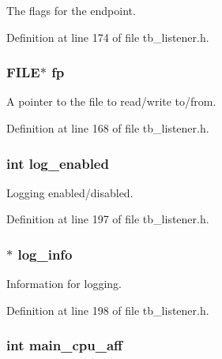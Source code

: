 The flags for the endpoint. 



Definition at line 174 of file tb\-\_\-listener.\-h.

\hypertarget{structtb__listener__t_aa065f30aa9f5f9a42132c82c787ee70b}{
\subsubsection[{fp}]{\setlength{\rightskip}{0pt plus 5cm}F\-I\-L\-E$\ast$ fp}}\label{structtb__listener__t_aa065f30aa9f5f9a42132c82c787ee70b}


A pointer to the file to read/write to/from. 



Definition at line 168 of file tb\-\_\-listener.\-h.

\hypertarget{structtb__listener__t_a511e73c6f56fe64b24f9261939aec65f}{
\subsubsection[{log\-\_\-enabled}]{\setlength{\rightskip}{0pt plus 5cm}int log\-\_\-enabled}}\label{structtb__listener__t_a511e73c6f56fe64b24f9261939aec65f}


Logging enabled/disabled. 



Definition at line 197 of file tb\-\_\-listener.\-h.

\hypertarget{structtb__listener__t_a206b8711b0b270577f073bdc99b0917d}{
\subsubsection[{log\-\_\-info}]{$\ast$ log\-\_\-info}}\label{structtb__listener__t_a206b8711b0b270577f073bdc99b0917d}


Information for logging. 



Definition at line 198 of file tb\-\_\-listener.\-h.

\hypertarget{structtb__listener__t_a2715f812fc8239e875c5e9413f8ed04b}{
\subsubsection[{main\-\_\-cpu\-\_\-aff}]{\setlength{\rightskip}{0pt plus 5cm}int main\-\_\-cpu\-\_\-aff}}\label{structtb__listener__t_a2715f812fc8239e875c5e9413f8ed04b}


